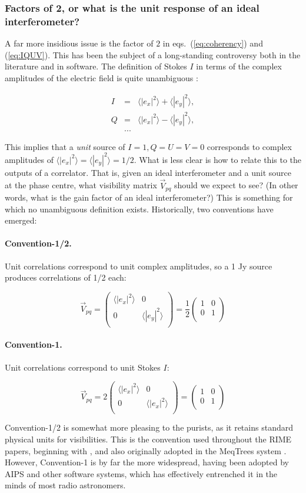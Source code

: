 \documentclass[]{aa}
\newcommand{\matrixtt}[4]{\left( \begin{array}{cc}#1&#2\\#3&#4\\\end{array} \right)}
\begin{document}
\subsubsection{\label{sec:factor2}Factors of 2, or what is the unit response of an ideal interferometer?}

A far more insidious issue is the factor of $2$ in eqs.~(\ref{eq:coherency}) and (\ref{eq:IQUV}). This has been the subject of a long-standing controversy both in the literature and in software. The definition of Stokes $I$ in terms of the complex amplitudes of the electric field is quite unambiguous \citep{tms,born-wolf}:

\begin{eqnarray*}
I&=&\langle |e_x|^2\rangle  + \langle |e_y|^2\rangle , \\
Q&=&\langle |e_x|^2\rangle  - \langle |e_y|^2\rangle , \\
&...&
\end{eqnarray*}

This implies that a {\em unit} source of $I=1, Q=U=V=0$ corresponds to complex amplitudes of $\langle |e_x|^2\rangle =\langle |e_y|^2\rangle = 1/2$. What is less clear is how to relate this to the outputs of a correlator. That is, given an ideal interferometer and a unit source at the phase centre, what visibility matrix $\vec V_{pq}$ should we expect to see? (In other words, what is the gain factor of an ideal interferometer?) This is something for which no unambiguous definition exists. Historically, two conventions have emerged:

\paragraph{Convention-1/2.} Unit correlations correspond to unit complex amplitudes, so a 1 Jy source produces correlations of 1/2 each: 

\[
\vec V_{pq} = \matrixtt{\langle |e_x|^2\rangle }{0}{0}{\langle |e_y|^2\rangle } = \frac{1}{2}\matrixtt{1}{0}{0}{1}
\]

\paragraph{Convention-1.} Unit correlations correspond to unit Stokes $I$:

\[
\vec V_{pq} = 2\matrixtt{\langle |e_x|^2\rangle }{0}{0}{\langle |e_x|^2\rangle } = \matrixtt{1}{0}{0}{1}
\]

Convention-1/2 is somewhat more pleasing to the purists, as it retains standard physical units for visibilities. This is the convention used throughout the RIME papers, beginning with \citet{ME1}, and also originally adopted in the MeqTrees system \citep{meqtrees}. However, Convention-1 is by far the more widespread, having been adopted by AIPS and other software systems, which has effectively entrenched it in the minds of most radio astronomers.
\end{document}
